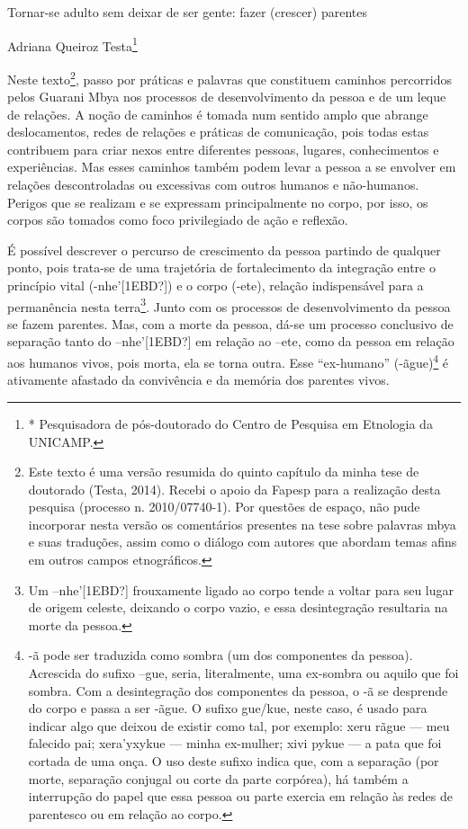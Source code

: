 \documentclass{article}
\begin{document}
Tornar-se adulto sem deixar de ser gente: fazer (crescer) parentes

Adriana Queiroz Testa\footnote{* Pesquisadora de p\'os-doutorado do
Centro de Pesquisa em Etnologia da UNICAMP.}

Neste texto\footnote{ Este texto \'e uma vers\~ao resumida do quinto
cap\'itulo da minha tese de doutorado (Testa, 2014). Recebi o apoio da
Fapesp para a realiza\c{c}\~ao desta pesquisa (processo n.
2010/07740-1). Por quest\~oes de espa\c{c}o, n\~ao pude incorporar
nesta vers\~ao os coment\'arios presentes na tese sobre palavras mbya e
suas tradu\c{c}\~oes, assim como o di\'alogo com autores que abordam
temas afins em outros campos etnogr\'aficos.}, passo por pr\'aticas e
palavras que constituem caminhos percorridos pelos Guarani Mbya nos
processos de desenvolvimento da pessoa e de um leque de rela\c{c}\~oes.
A no\c{c}\~ao de caminhos \'e tomada num sentido amplo que abrange
deslocamentos, redes de rela\c{c}\~oes e pr\'aticas de
comunica\c{c}\~ao, pois todas estas contribuem para criar nexos entre
diferentes pessoas, lugares, conhecimentos e experi\^encias. Mas esses
caminhos tamb\'em podem levar a pessoa a se envolver em rela\c{c}\~oes
descontroladas ou excessivas com outros humanos e n\~ao-humanos.
Perigos que se realizam e se expressam principalmente no corpo, por
isso, os corpos s\~ao tomados como foco privilegiado de a\c{c}\~ao e
reflex\~ao.

\'E poss\'ivel descrever o percurso de crescimento da pessoa partindo de
qualquer ponto, pois trata-se de uma trajet\'oria de fortalecimento da
integra\c{c}\~ao entre o princ\'ipio vital
(-nhe{\textquoteright}[1EBD?]) e o corpo ({}-ete), rela\c{c}\~ao
indispens\'avel para a perman\^encia nesta terra\footnote{ Um
--nhe{\textquoteright}[1EBD?] frouxamente ligado ao corpo tende a
voltar para seu lugar de origem celeste, deixando o corpo vazio, e essa
desintegra\c{c}\~ao resultaria na morte da pessoa. }. Junto com os
processos de desenvolvimento da pessoa se fazem parentes. Mas, com a
morte da pessoa, d\'a-se um processo conclusivo de separa\c{c}\~ao
tanto do --nhe{\textquoteright}[1EBD?] em rela\c{c}\~ao ao {}--ete,
como da pessoa em rela\c{c}\~ao aos humanos vivos, pois morta, ela se
torna outra. Esse {\textquotedblleft}ex-humano{\textquotedblright}
(-\~ague)\footnote{ {}-\~a pode ser traduzida como sombra (um dos
componentes da pessoa). Acrescida do sufixo {}--gue, seria,
literalmente, uma ex-sombra ou aquilo que foi sombra. Com a
desintegra\c{c}\~ao dos componentes da pessoa, o -\~a se desprende do
corpo e passa a ser -\~ague. O sufixo gue/kue, neste caso, \'e usado
para indicar algo que deixou de existir como tal, por exemplo: xeru
r\~ague {}--- meu falecido pai; xera{\textquoteright}yxykue {}--- minha
ex-mulher; xivi pykue {}--- a pata que foi cortada de uma on\c{c}a. O
uso deste sufixo indica que, com a separa\c{c}\~ao (por morte,
separa\c{c}\~ao conjugal ou corte da parte corp\'orea), h\'a tamb\'em a
interrup\c{c}\~ao do papel que essa pessoa ou parte exercia em
rela\c{c}\~ao \`as redes de parentesco ou em rela\c{c}\~ao ao corpo.}
\'e ativamente afastado da conviv\^encia e da mem\'oria dos parentes
vivos. 
\end{document}
